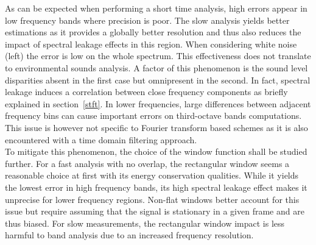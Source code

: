 \documentclass[12pt,times,onecolumn]{article}
\begin{document}
As can be expected when performing a short time analysis, high errors appear in low frequency bands where precision is poor. The slow analysis yields better estimations as it provides a globally better resolution and thus also reduces the impact of spectral leakage effects in this region. When considering white noise (left) the error is low on the whole spectrum. This effectiveness does not translate to environmental sounds analysis. A factor of this phenomenon is the sound level disparities absent in the first case but omnipresent in the second. In fact, spectral leakage induces a correlation between close frequency components as briefly explained in section~\ref{stft}. In lower frequencies, large differences between adjacent frequency bins can cause important errors on third-octave bands computations. This issue is however not specific to Fourier transform based schemes as it is also encountered with a time domain filtering approach.\\

To mitigate this phenomenon, the choice of the window function shall be studied further. For a fast analysis with no overlap, the rectangular window seems a reasonable choice at first with its energy conservation qualities. While it yields the lowest error in high frequency bands, its high spectral leakage effect makes it unprecise for lower frequency regions. Non-flat windows better account for this issue but require assuming that the signal is stationary in a given frame and are thus biased. For slow measurements, the rectangular window impact is less harmful to band analysis due to an increased frequency resolution.\\
\end{document}
